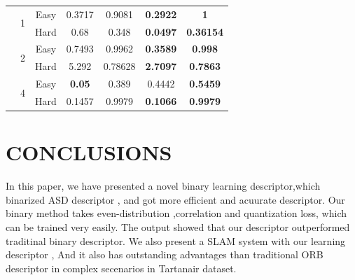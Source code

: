 \documentclass{svproc}
\begin{document}
\begin{table}[h]
\begin{center}
\begin{tabular}{ccccccc}
                                   &  \multirow{2}{*}{1}   &  \multicolumn{1}{c}{Easy}  & \multicolumn{1}{c}{0.3717} & \multicolumn{1}{c}{0.9081} & \multicolumn{1}{c}{\textbf{0.2922}}  & \multicolumn{1}{c}{\textbf{1}}   \\
  \cline{3-7}
                                                          & \multicolumn{1}{c}{} &  \multicolumn{1}{c}{Hard}  & \multicolumn{1}{c}{0.68} & \multicolumn{1}{c}{0.348} & \multicolumn{1}{c}{\textbf{0.0497}}  & \multicolumn{1}{c}{\textbf{0.36154}}   \\
  \cline{2-7}
                                    &  \multirow{2}{*}{2}   &  \multicolumn{1}{c}{Easy}  & \multicolumn{1}{c}{0.7493} & \multicolumn{1}{c}{0.9962} & \multicolumn{1}{c}{\textbf{0.3589}}  & \multicolumn{1}{c}{\textbf{0.998}}   \\
  \cline{3-7}
                                                          & \multicolumn{1}{c}{} &  \multicolumn{1}{c}{Hard}  & \multicolumn{1}{c}{5.292} & \multicolumn{1}{c}{0.78628} & \multicolumn{1}{c}{\textbf{2.7097}}  & \multicolumn{1}{c}{\textbf{0.7863}}   \\
  \cline{2-7}
                                    &  \multirow{2}{*}{4}   &  \multicolumn{1}{c}{Easy}  & \multicolumn{1}{c}{\textbf{0.05}} & \multicolumn{1}{c}{0.389} & \multicolumn{1}{c}{0.4442}  & \multicolumn{1}{c}{\textbf{0.5459}}   \\
  \cline{3-7}
                                                          & \multicolumn{1}{c}{} &  \multicolumn{1}{c}{Hard}  & \multicolumn{1}{c}{0.1457} & \multicolumn{1}{c}{0.9979} & \multicolumn{1}{c}{\textbf{0.1066}}  & \multicolumn{1}{c}{\textbf{0.9979}}   \\

\midrule
\toprule
\end{tabular} 
\end{center}
\end{table}
\vspace{-0.47cm}


\section{CONCLUSIONS}

In this paper, we have presented a novel binary learning descriptor,which binarized ASD descriptor , and got more efficient and acuurate descriptor. Our binary method takes even-distribution ,correlation and quantization loss, which can be trained very easily. The output showed that our descriptor outperformed traditinal binary descriptor. We also present a SLAM system with our learning descriptor , And it also has outstanding advantages than traditional ORB descriptor in complex secenarios in Tartanair dataset.
\end{document}
